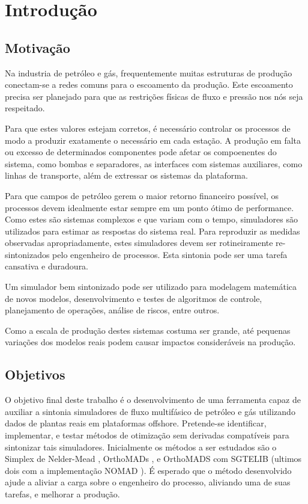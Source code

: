 

\chapter{Introdução} \label{chap:1}



\section{Motivação}
Na industria de petróleo e gás, frequentemente muitas estruturas de produção conectam-se a redes comuns para o escoamento da produção. Este escoamento precisa ser planejado para que as restrições físicas de fluxo e pressão nos nós seja respeitado.

Para que estes valores estejam corretos, é necessário controlar os processos de modo a produzir exatamente o necessário em cada estação. A produção em falta ou excesso de determinados componentes pode afetar os compoenentes do sistema, como bombas e separadores, as interfaces com sistemas auxiliares, como linhas de transporte, além de extressar os sistemas da plataforma.

  Para que campos de petróleo gerem o maior retorno financeiro possível, os processos devem idealmente estar sempre em um ponto ótimo de performance. Como estes são sistemas complexos e que variam com o tempo, simuladores são utilizados para estimar as respostas do sistema real. Para reproduzir as medidas observadas apropriadamente, estes simuladores devem ser rotineiramente re-sintonizados pelo engenheiro de processos. Esta sintonia pode ser uma tarefa cansativa e duradoura.
  
Um simulador bem sintonizado pode ser utilizado para modelagem matemática de novos modelos, desenvolvimento e testes de algoritmos de controle, planejamento de operações, análise de riscos, entre outros.	

Como a escala de produção destes sistemas costuma ser grande, até pequenas variações dos modelos reais podem causar impactos consideráveis na produção.


\section{Objetivos}

O objetivo final deste trabalho é o desenvolvimento de uma ferramenta capaz de auxiliar a sintonia simuladores de fluxo multifásico de petróleo e gás utilizando dados de plantas reais em plataformas offshore. Pretende-se identificar, implementar, e testar métodos de otimização sem derivadas compatíveis para sintonizar tais simuladores.
Inicialmente os métodos a ser estudados são o Simplex de Nelder-Mead \cite{Singer:2009}, OrthoMADs \cite{DBLP:journals/siamjo/AbramsonADD09}, e OrthoMADS com SGTELIB (ultimos dois com a implementação NOMAD \cite{Nomad}).
É esperado que o método desenvolvido ajude a aliviar a carga sobre o engenheiro do processo, aliviando uma de suas tarefas, e melhorar a produção.

